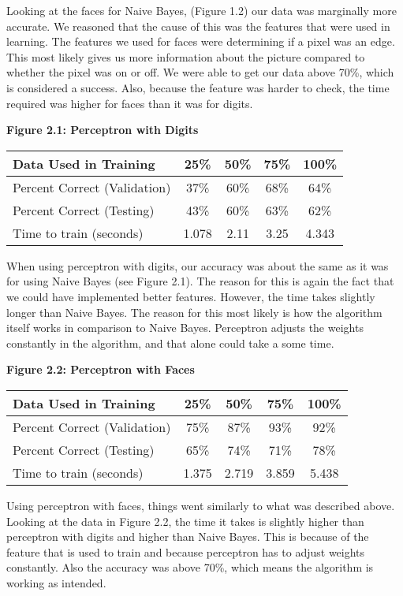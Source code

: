 \documentclass[11pt]{article} %
\begin{document}
\par
Looking at the faces for Naive Bayes, (Figure 1.2) our data was marginally more accurate. We reasoned that the cause of this was the features that were used in learning. The features we used for faces were determining if a pixel was an edge. This most likely gives us more information about the picture compared to whether the pixel was on or off. We were able to get our data above 70\%, which is considered a success. Also, because the feature was harder to check, the time required was higher for faces than it was for digits.\\
\begin{center}
\textbf{Figure 2.1: Perceptron with Digits}
\begin{tabular}{| l | c | c | c | c |}
\hline
Data Used in Training & 25\% & 50\% & 75\% & 100\%\\ \hline
Percent Correct (Validation) & 37\% & 60\% & 68\% & 64\%\\
Percent Correct (Testing) & 43\% & 60\% & 63\% & 62\%\\
Time to train (seconds) & 1.078 & 2.11 & 3.25 & 4.343\\
\hline
\end{tabular}
\end{center}
\par
When using perceptron with digits, our accuracy was about the same as it was for using Naive Bayes (see Figure 2.1). The reason for this is again the fact that we could have implemented better features. However, the time takes slightly longer than Naive Bayes. The reason for this most likely is how the algorithm itself works in comparison to Naive Bayes. Perceptron adjusts the weights constantly in the algorithm, and that alone could take a some time.\\
\begin{center}
\textbf{Figure 2.2: Perceptron with Faces}
\begin{tabular}{| l | c | c | c | c |}
\hline
Data Used in Training & 25\% & 50\% & 75\% & 100\%\\ \hline
Percent Correct (Validation) & 75\% & 87\% & 93\% & 92\%\\
Percent Correct (Testing) & 65\% & 74\% & 71\% & 78\%\\
Time to train (seconds) & 1.375 & 2.719 & 3.859 & 5.438\\
\hline
\end{tabular}
\end{center}
\par
Using perceptron with faces, things went similarly to what was described above. Looking at the data in Figure 2.2, the time it takes is slightly higher than perceptron with digits and higher than Naive Bayes. This is because of the feature that is used to train and because perceptron has to adjust weights constantly. Also the accuracy was above 70\%, which means the algorithm is working as intended.\newpage
\end{document}
